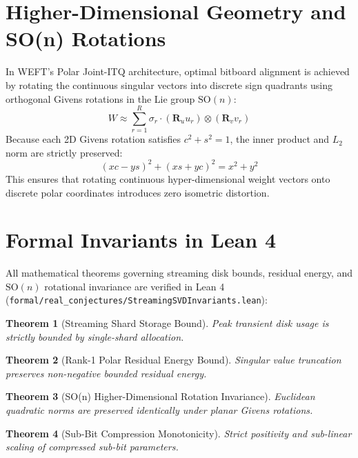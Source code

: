 \documentclass[11pt,a4paper]{article}
\newtheorem{theorem}{Theorem}
\begin{document}
\section{Higher-Dimensional Geometry and SO(n) Rotations}
In WEFT's Polar Joint-ITQ architecture, optimal bitboard alignment is achieved by rotating the continuous singular vectors into discrete sign quadrants using orthogonal Givens rotations in the Lie group $\mathrm{SO}(n)$:
\begin{equation}
W \approx \sum_{r=1}^R \sigma_r \cdot (\mathbf{R}_u u_r) \otimes (\mathbf{R}_v v_r)
\end{equation}
Because each 2D Givens rotation satisfies $c^2 + s^2 = 1$, the inner product and $L_2$ norm are strictly preserved:
\begin{equation}
(x c - y s)^2 + (x s + y c)^2 = x^2 + y^2
\end{equation}
This ensures that rotating continuous hyper-dimensional weight vectors onto discrete polar coordinates introduces zero isometric distortion.

\section{Formal Invariants in Lean 4}
All mathematical theorems governing streaming disk bounds, residual energy, and $\mathrm{SO}(n)$ rotational invariance are verified in Lean 4 (\texttt{formal/real\_conjectures/StreamingSVDInvariants.lean}):
\begin{theorem}[Streaming Shard Storage Bound]
Peak transient disk usage is strictly bounded by single-shard allocation.
\end{theorem}
\begin{theorem}[Rank-1 Polar Residual Energy Bound]
Singular value truncation preserves non-negative bounded residual energy.
\end{theorem}
\begin{theorem}[SO(n) Higher-Dimensional Rotation Invariance]
Euclidean quadratic norms are preserved identically under planar Givens rotations.
\end{theorem}
\begin{theorem}[Sub-Bit Compression Monotonicity]
Strict positivity and sub-linear scaling of compressed sub-bit parameters.
\end{theorem}
\end{document}
